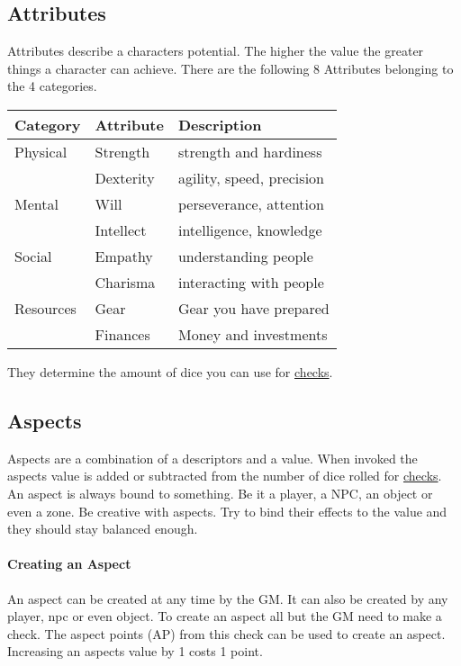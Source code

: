 \documentclass[11pt]{article}
\begin{document}
{\subsection{Attributes}
\label{sec:org1985c5b}
Attributes describe a characters potential. The higher the value the greater things a character can achieve. There are the following 8 Attributes belonging to the 4 categories.

\begin{center}
\begin{tabular}{lll}
\textbf{Category} & \textbf{Attribute} & \textbf{Description}\\[0pt]
\hline
Physical & Strength & strength and hardiness\\[0pt]
 & Dexterity & agility, speed, precision\\[0pt]
\hline
Mental & Will & perseverance, attention\\[0pt]
 & Intellect & intelligence, knowledge\\[0pt]
\hline
Social & Empathy & understanding people\\[0pt]
 & Charisma & interacting with people\\[0pt]
\hline
Resources & Gear & Gear you have prepared\\[0pt]
 & Finances & Money and investments\\[0pt]
\end{tabular}
\end{center}

They determine the amount of dice you can use for \hyperref[sec:org06c2956]{checks}. 

\subsection{Aspects}
\label{sec:orgd71b72b}
Aspects are a combination of a descriptors and a value. When invoked the aspects value is added or subtracted from the number of dice rolled for \hyperref[sec:org06c2956]{checks}. An aspect is always bound to something. Be it a player, a NPC, an object or even a zone. Be creative with aspects. Try to bind their effects to the value and they should stay balanced enough.

\paragraph*{Creating an Aspect}
\label{sec:orgfb4830c}

An aspect can be created at any time by the GM. It can also be created by any player, npc or even object. To create an aspect all but the GM need to make a check. The aspect points (AP) from this check can be used to create an aspect. Increasing an aspects value by 1 costs 1 point.

}
\end{document}
